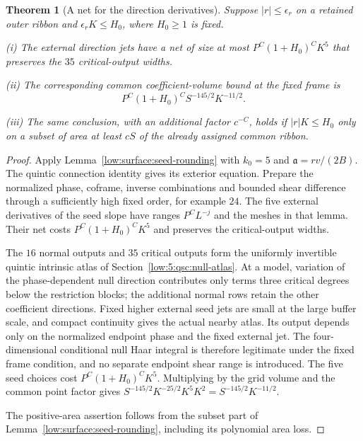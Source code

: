 \documentclass[11pt]{amsart}
\newtheorem{theorem}{Theorem}[section]
\theoremstyle{definition}
\theoremstyle{remark}
\numberwithin{equation}{section}
\begin{document}
\begin{theorem}[A net for the direction derivatives]\label{low:5:qsa:smallaspect}
Suppose $|r|\le\epsilon_r$ on a retained outer ribbon and $\epsilon_rK\le H_0$, where $H_0\ge1$ is fixed.

\noindent\textup{(i)} The external direction jets have a net of size at most $P^C(1+H_0)^CK^5$ that preserves the $35$ critical-output widths.

\noindent\textup{(ii)} The corresponding common coefficient-volume bound at the fixed frame is
\[
P^C(1+H_0)^CS^{-145/2}K^{-11/2}.
\]

\noindent\textup{(iii)} The same conclusion, with an additional factor $c^{-C}$, holds if $|r|K\le H_0$ only on a subset of area at least $cS$ of the already assigned common ribbon.
\end{theorem}
\begin{proof}
Apply Lemma~\ref{low:surface:seed-rounding} with $k_0=5$ and $\mathfrak a=rv/(2B)$. The quintic connection identity gives its exterior equation. Prepare the normalized phase, coframe, inverse combinations and bounded shear difference through a sufficiently high fixed order, for example $24$. The five external derivatives of the seed slope have ranges $P^CL^{-j}$ and the meshes in that lemma. Their net costs $P^C(1+H_0)^CK^5$ and preserves the critical-output widths.

The $16$ normal outputs and $35$ critical outputs form the uniformly invertible quintic intrinsic atlas of Section~\ref{low:5:qsc:null-atlas}. At a model, variation of the phase-dependent null direction contributes only terms three critical degrees below the restriction blocks; the additional normal rows retain the other coefficient directions. Fixed higher external seed jets are small at the large buffer scale, and compact continuity gives the actual nearby atlas. Its output depends only on the normalized endpoint phase and the fixed external jet. The four-dimensional conditional null Haar integral is therefore legitimate under the fixed frame condition, and no separate endpoint shear range is introduced. The five seed choices cost $P^C(1+H_0)^CK^5$. Multiplying by the grid volume and the common point factor gives $S^{-145/2}K^{-25/2}K^5K^2=S^{-145/2}K^{-11/2}$.

The positive-area assertion follows from the subset part of Lemma~\ref{low:surface:seed-rounding}, including its polynomial area loss.
\end{proof}
\end{document}

